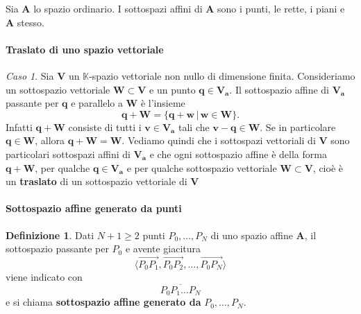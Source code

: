 \documentclass{article}
\theoremstyle{plain}
\theoremstyle{definition}
\newtheorem{defn}{Definizione}[section]
\theoremstyle{remark}
\newtheorem{case}{Caso}
\begin{document}
\vspace{10pt}

Sia $\mathbf{A}$ lo spazio ordinario. 
I sottospazi affini di $\mathbf{A}$ sono i punti, le rette, i piani e $\mathbf{A}$ stesso.

\vspace{10pt}

\paragraph{Traslato di uno spazio vettoriale}
\begin{case}
    Sia $\mathbf{V}$ un $\mathbb{K}$-spazio vettoriale non nullo di dimensione finita. 
    Consideriamo un sottospazio vettoriale $\mathbf{W}\subset\mathbf{V}$ e un punto $\mathbf{q}\in\mathbf{V}_\mathbf{a}$.
    Il sottospazio affine di $\mathbf{V}_\mathbf{a}$ passante per $\mathbf{q}$ e parallelo a $\mathbf{W}$ è l'insieme 
    \[\mathbf{q}+\mathbf{W}=\{\mathbf{q}+\mathbf{w}\,|\,\mathbf{w}\in\mathbf{W}\}.\]
    Infatti $\mathbf{q}+\mathbf{W}$ consiste di tutti i $\mathbf{v}\in\mathbf{V}_\mathbf{a}$ tali che $\mathbf{v}-\mathbf{q}\in\mathbf{W}$.
    Se in particolare $\mathbf{q}\in\mathbf{W}$, allora $\mathbf{q}+\mathbf{W}=\mathbf{W}$. Vediamo quindi che i sottospazi vettoriali di $\mathbf{V}$ sono particolari
    sottospazi affini di $\mathbf{V}_\mathbf{a}$ e che ogni sottospazio affine è della forma $\mathbf{q}+\mathbf{W}$, per qualche $\mathbf{q}\in\mathbf{V}_\mathbf{a}$ 
    e per qualche sottospazio vettoriale $\mathbf{W}\subset\mathbf{V}$, cioè è un \textbf{traslato} di un sottospazio vettoriale di $\mathbf{V}$
\end{case}

\vspace{10pt}

\paragraph{Sottospazio affine generato da punti}
\begin{bxthm}
\begin{defn}
    Dati $N+1\geq2$ punti $P_0,\dots,P_N$ di uno spazio affine $\mathbf{A}$, il sottospazio passante per $P_0$ e avente giacitura \[\langle\overrightarrow{P_0P_1},\overrightarrow{P_0P_2},\dots,\overrightarrow{P_0P_N}\rangle\]
    viene indicato con \[\overline{P_0P_1\dots P_N}\]e si chiama \textbf{sottospazio affine generato da }$P_0,\dots,P_N$.
\end{defn}
\end{bxthm}
\end{document}
